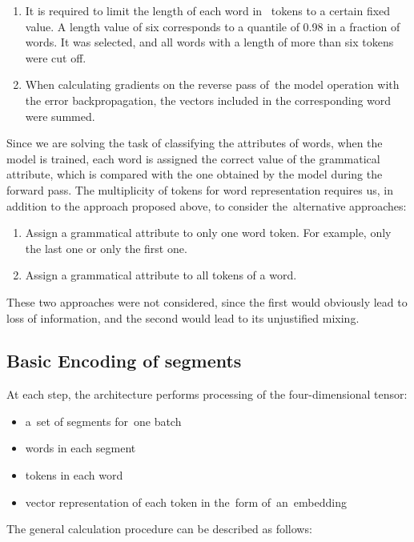 \documentclass[11pt,twocolumn]{article}
\begin{document}
\begin{enumerate}
\item{
It is required to limit the length of each word in ~tokens to a certain fixed value.
A length value of six corresponds to a quantile of 0.98 in a fraction of words.
It was selected, and all words with a length of more than six tokens were cut off.
}
\item{
  When calculating gradients on the reverse pass of~the model operation with the error backpropagation,
  the vectors included in the corresponding word were summed.
}
\end{enumerate}

Since we are solving the task of classifying the attributes of words, when the model is trained, each word is assigned the correct value of the grammatical attribute,
which is compared with the one obtained by the model during the forward pass.
The multiplicity of tokens for word representation requires us, in addition to the approach proposed above, to consider the~alternative approaches:

\begin{enumerate}
\item{
Assign a grammatical attribute to only one word token. For example, only the last one or only the first one.
}
\item{
Assign a grammatical attribute to all tokens of a word.
}
\end{enumerate}

These two approaches were not considered, since the first would obviously lead to loss of information, and the second would lead to its unjustified mixing.

\subsection{Basic Encoding of segments}

At each step, the architecture performs processing of the four-dimensional tensor:

\begin{itemize}
\item{
a~set of segments for~one batch
}
\item{
words in each segment
}
\item{
tokens in each word
}
\item{
vector representation of each token in the~form of~an~embedding
}
\end{itemize}

The general calculation procedure can be described as follows:
\end{document}
